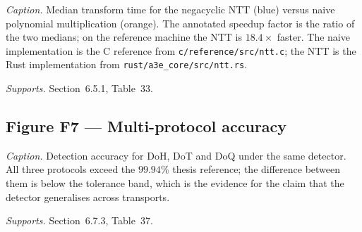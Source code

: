 \emph{Caption.} Median transform time for the negacyclic NTT
(blue) versus naive polynomial multiplication (orange). The
annotated speedup factor is the ratio of the two medians; on the
reference machine the NTT is $18.4\times$ faster. The naive
implementation is the C reference from
\texttt{c/reference/src/ntt.c}; the NTT is the Rust implementation
from \texttt{rust/a3e\_core/src/ntt.rs}.

\emph{Supports.} Section~6.5.1, Table~33.

\subsection*{Figure F7 --- Multi-protocol accuracy}

\emph{Caption.} Detection accuracy for DoH, DoT and DoQ under the
same detector. All three protocols exceed the $99.94\%$ thesis
reference; the difference between them is below the tolerance band,
which is the evidence for the claim that the detector generalises
across transports.

\emph{Supports.} Section~6.7.3, Table~37.
